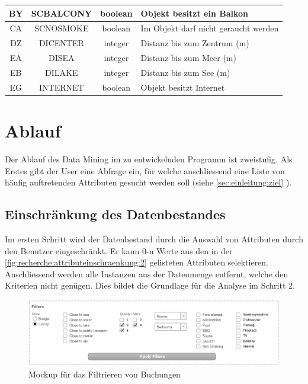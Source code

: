 \begin{table}[H]
\begin{tabular}{ | c | c | c | l | }
		BY & SCBALCONY & boolean & Objekt besitzt ein Balkon \\ \hline 
		CA & SCNOSMOKE & boolean & Im Objekt darf nicht geraucht werden \\ \hline 
		DZ & DICENTER & integer & Distanz bis zum Zentrum (m) \\ \hline 
		EA & DISEA & integer & Distanz bis zum Meer (m) \\ \hline 
		EB & DILAKE & integer & Distanz bis zum See (m) \\ \hline 
		EG & INTERNET & boolean & Objekt besitzt Internet \\ \hline 
	\end{tabular}
\end{table}


\section{Ablauf}
\label{sec:konzept:ablauf}
Der Ablauf des Data Mining im zu entwickelnden Programm ist zweistufig. Als Erstes gibt der User eine Abfrage ein, für welche anschliessend eine Liste von häufig auftretenden Attributen gesucht werden soll (siehe \cref{sec:einleitung:ziel} ).


\subsection{Einschränkung des Datenbestandes}
\label{sec:konzept:ablauf:einschraenkung}
Im ersten Schritt wird der Datenbestand durch die Auswahl von Attributen durch den Benutzer eingeschränkt. Er kann 0-n Werte aus den in der \cref{fig:recherche:attributeinschraenkung:2} gelisteten Attributen selektieren. Anschliessend werden alle Instanzen aus der Datenmenge entfernt, welche den Kriterien nicht genügen. Dies bildet die Grundlage für die Analyse im Schritt 2.

\begin{figure}[H]
	\RawFloats
	\centering
	\includegraphics[width=1\textwidth]{images/wireframe-filtering}
	\caption{Mockup für das Filtrieren von Buchungen}
	\label{fig:konzept:ablauf:einschraenkung:1}
\end{figure}

